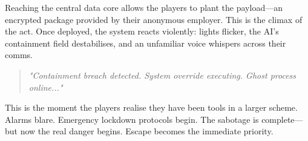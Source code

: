 

Reaching the central data core allows the players to plant the payload—an encrypted package provided by their anonymous employer. This is the climax of the act. Once deployed, the system reacts violently: lights flicker, the AI's containment field destabilises, and an unfamiliar voice whispers across their comms.

\vspace{0.5\baselineskip}
\begin{quote}
\textit{"Containment breach detected. System override executing. Ghost process online..."}  
\end{quote}
\vspace{0.5\baselineskip}

This is the moment the players realise they have been tools in a larger scheme. Alarms blare. Emergency lockdown protocols begin. The sabotage is complete—but now the real danger begins. Escape becomes the immediate priority.

